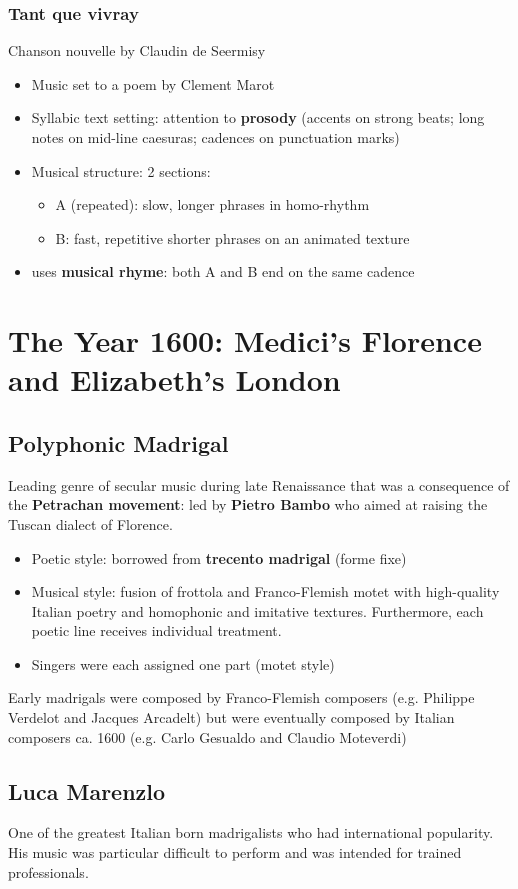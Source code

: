 \documentclass{article}
\begin{document}
  \subsubsection{Tant que vivray}
  Chanson nouvelle by Claudin de Seermisy
  \begin{itemize}
    \item Music set to a poem by Clement Marot
    \item Syllabic text setting: attention to \textbf{prosody} (accents on strong beats; long notes on mid-line caesuras; cadences on punctuation marks)
    \item Musical structure: 2 sections:
      \begin{itemize}
        \item A (repeated): slow, longer phrases in homo-rhythm
        \item B: fast, repetitive shorter phrases on an animated texture
      \end{itemize}
    \item uses \textbf{musical rhyme}: both A and B end on the same cadence
  \end{itemize}
  \section{The Year 1600: Medici's Florence and Elizabeth's London}
  \subsection{Polyphonic Madrigal}
  Leading genre of secular music during late Renaissance that was a consequence of the \textbf{Petrachan movement}: led by \textbf{Pietro Bambo} who aimed at raising the Tuscan dialect of Florence.
  \begin{itemize}
    \item Poetic style: borrowed from \textbf{trecento madrigal} (forme fixe)
    \item Musical style: fusion of frottola and Franco-Flemish motet with high-quality Italian poetry and homophonic and imitative textures. Furthermore, each poetic line receives individual treatment.
    \item Singers were each assigned one part (motet style)
  \end{itemize}
  Early madrigals were composed by Franco-Flemish composers (e.g. Philippe Verdelot and Jacques Arcadelt) but were eventually composed by Italian composers ca. 1600 (e.g. Carlo Gesualdo and Claudio Moteverdi)
  \subsection{Luca Marenzlo}
  One of the greatest Italian born madrigalists who had international popularity. His music was particular difficult to perform and was intended for trained professionals.
\end{document}
